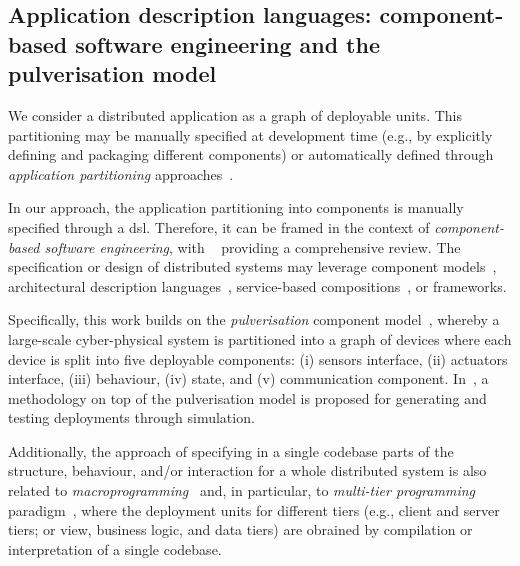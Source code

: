 \documentclass[conference]{IEEEtran}
\begin{document}
 
 
\subsection{Application description languages: component-based software engineering and the pulverisation model}
\label{sec:rw:whatsw}
%
%
We consider a distributed application 
 as a graph of deployable units.
%
This partitioning may be 
 manually specified at development time
 (e.g., by explicitly defining and packaging different components)
 or automatically defined
 through \emph{application partitioning} approaches~\cite{DBLP:journals/jnca/LiuASGBQ15}. %
 
In our approach, the application partitioning into components is manually specified through a \ac{dsl}.
%
Therefore, it can be framed in the context of \emph{component-based software engineering},
 with ~\cite{vale2016component-based-se} providing a comprehensive review.
%
The specification or design of distributed systems
 may leverage
 component models~\cite{DBLP:journals/tse/CrnkovicSVC11},
 architectural description languages~\cite{DBLP:journals/tse/MedvidovicT00},
 service-based compositions~\cite{DBLP:journals/csur/LemosDB16}, 
 or frameworks.
%

Specifically,
 this work builds on the \emph{pulverisation} component model~\cite{FI2020-pulverization,IEEE-IoTJ-pulverization-simulation},
 whereby a large-scale cyber-physical system
 is partitioned into a graph of devices
 where each device is split into five deployable components:
 (i) sensors interface, 
 (ii) actuators interface, 
 (iii) behaviour, 
 (iv) state, and 
 (v) communication component.
%
In~\cite{IEEE-IoTJ-pulverization-simulation},
 a methodology on top of the pulverisation model
 is proposed
 for generating and testing deployments through simulation.

Additionally,
 the approach of specifying in a single codebase 
 parts of the structure, behaviour, and/or interaction 
 for a whole distributed system
 is also related to \emph{macroprogramming}~\cite{Casadei2023macro}
 and, in particular, to \emph{multi-tier programming} paradigm~\cite{DBLP:journals/csur/WeisenburgerWS20},
 where the deployment units for different tiers (e.g., client and server tiers; or view, business logic, and data tiers) are obrained by compilation or interpretation of a single codebase.
\end{document}
